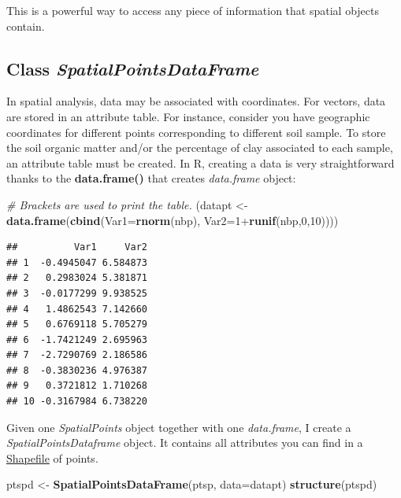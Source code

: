 \documentclass[]{report}
\newenvironment{Shaded}{\begin{snugshade}}{\end{snugshade}}
\newcommand{\KeywordTok}[1]{\textcolor[rgb]{0.13,0.29,0.53}{\textbf{{#1}}}}
\newcommand{\DataTypeTok}[1]{\textcolor[rgb]{0.13,0.29,0.53}{{#1}}}
\newcommand{\DecValTok}[1]{\textcolor[rgb]{0.00,0.00,0.81}{{#1}}}
\newcommand{\StringTok}[1]{\textcolor[rgb]{0.31,0.60,0.02}{{#1}}}
\newcommand{\CommentTok}[1]{\textcolor[rgb]{0.56,0.35,0.01}{\textit{{#1}}}}
\newcommand{\NormalTok}[1]{{#1}}
\begin{document}
This is a powerful way to access any piece of information that spatial
objects contain.

\subsection{\texorpdfstring{Class
\emph{SpatialPointsDataFrame}}{Class SpatialPointsDataFrame}}\label{class-spatialpointsdataframe}

In spatial analysis, data may be associated with coordinates. For
vectors, data are stored in an attribute table. For instance, consider
you have geographic coordinates for different points corresponding to
different soil sample. To store the soil organic matter and/or the
percentage of clay associated to each sample, an attribute table must be
created. In R, creating a data is very straightforward thanks to the
\textbf{data.frame()} that creates \emph{data.frame} object:

\begin{Shaded}
\begin{Highlighting}[]
\CommentTok{# Brackets are used to print the table.}
\NormalTok{(datapt <-}\StringTok{ }\KeywordTok{data.frame}\NormalTok{(}\KeywordTok{cbind}\NormalTok{(}\DataTypeTok{Var1=}\KeywordTok{rnorm}\NormalTok{(nbp), }\DataTypeTok{Var2=}\DecValTok{1}\NormalTok{+}\KeywordTok{runif}\NormalTok{(nbp,}\DecValTok{0}\NormalTok{,}\DecValTok{10}\NormalTok{))))}
\end{Highlighting}
\end{Shaded}

\begin{verbatim}
##          Var1     Var2
## 1  -0.4945047 6.584873
## 2   0.2983024 5.381871
## 3  -0.0177299 9.938525
## 4   1.4862543 7.142660
## 5   0.6769118 5.705279
## 6  -1.7421249 2.695963
## 7  -2.7290769 2.186586
## 8  -0.3830236 4.976387
## 9   0.3721812 1.710268
## 10 -0.3167984 6.738220
\end{verbatim}

Given one \emph{SpatialPoints} object together with one
\emph{data.frame}, I create a \emph{SpatialPointsDataframe} object. It
contains all attributes you can find in a
\href{https://en.wikipedia.org/wiki/Shapefile}{Shapefile} of points.

\begin{Shaded}
\begin{Highlighting}[]
\NormalTok{ptspd <-}\StringTok{ }\KeywordTok{SpatialPointsDataFrame}\NormalTok{(ptsp, }\DataTypeTok{data=}\NormalTok{datapt)}
\KeywordTok{structure}\NormalTok{(ptspd)}
\end{Highlighting}
\end{Shaded}
\end{document}
